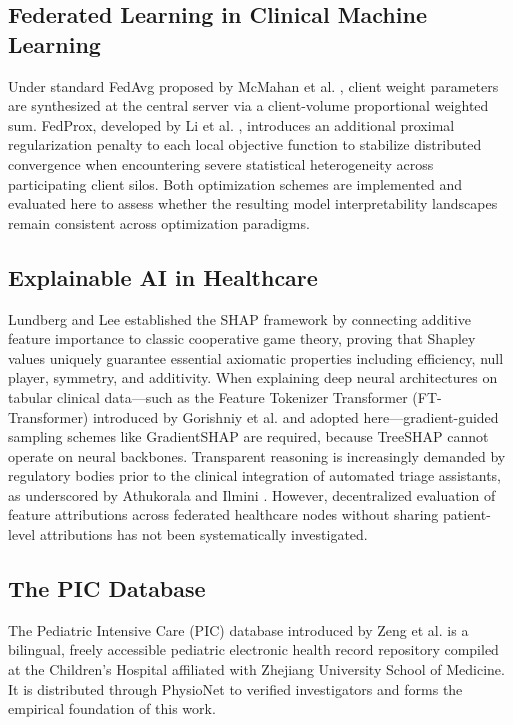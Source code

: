 \documentclass{svproc}
\begin{document}
\subsection{Federated Learning in Clinical Machine Learning}
Under standard FedAvg proposed by McMahan et al. \cite{mcmahan2017fedavg}, client weight parameters are synthesized at the central server via a client-volume proportional weighted sum. FedProx, developed by Li et al. \cite{li2020fedprox}, introduces an additional proximal regularization penalty to each local objective function to stabilize distributed convergence when encountering severe statistical heterogeneity across participating client silos. Both optimization schemes are implemented and evaluated here to assess whether the resulting model interpretability landscapes remain consistent across optimization paradigms.

\subsection{Explainable AI in Healthcare}
Lundberg and Lee \cite{lundberg2017shap} established the SHAP framework by connecting additive feature importance to classic cooperative game theory, proving that Shapley values uniquely guarantee essential axiomatic properties including efficiency, null player, symmetry, and additivity. When explaining deep neural architectures on tabular clinical data---such as the Feature Tokenizer Transformer (FT-Transformer) introduced by Gorishniy et al. \cite{gorishniy2021revisiting} and adopted here---gradient-guided sampling schemes like GradientSHAP are required, because TreeSHAP cannot operate on neural backbones. Transparent reasoning is increasingly demanded by regulatory bodies prior to the clinical integration of automated triage assistants, as underscored by Athukorala and Ilmini \cite{athukorala2026explainable}. However, decentralized evaluation of feature attributions across federated healthcare nodes without sharing patient-level attributions has not been systematically investigated.

\subsection{The PIC Database}
The Pediatric Intensive Care (PIC) database introduced by Zeng et al. \cite{zeng2020pic} is a bilingual, freely accessible pediatric electronic health record repository compiled at the Children's Hospital affiliated with Zhejiang University School of Medicine. It is distributed through PhysioNet to verified investigators and forms the empirical foundation of this work.
\end{document}
